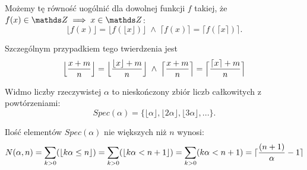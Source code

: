 Możemy tę równość uogólnić dla dowolnej funkcji $f$ takiej, że $f(x)\in \Z\implies x\in \Z$:
$$\lfloor f(x)\rfloor=\lfloor f(\lfloor x\rfloor)\rfloor\;\land\; \lceil f(x)\rceil=\lceil f(\lceil x\rceil)\rceil.$$

Szczególnym przypadkiem tego twierdzenia jest
$$\Big\lfloor {x+m\over n}\Big\rfloor=\Big\lfloor {\lfloor x\rfloor+m\over n}\Big\rfloor\;\land\;\Big\lceil {x+m\over n}\Big\rceil=\Big\lceil {\lceil x\rceil+m\over n}\Big\rceil$$

\bigskip

\bigskip

{\color{def}Widmo liczby rzeczywistej} $\alpha$ to nieskończony zbiór liczb całkowitych z powtórzeniami:
$$Spec(\alpha) = \{\lfloor\alpha\rfloor, \lfloor2\alpha\rfloor, \lfloor3\alpha\rfloor, ...\}.$$

Ilość elementów $Spec(\alpha)$ nie większych niż $n$ wynosi:
\begin{align*}
    N(\alpha, n)=\sum\limits_{k>0}(\lfloor k\alpha\leq n\rfloor)=\sum\limits_{k>0}(\lfloor k\alpha<n+1\rfloor)=\sum\limits_{k>0}(k\alpha<n+1)=\lceil {(n+1)\over\alpha}-1\rceil
\end{align*}